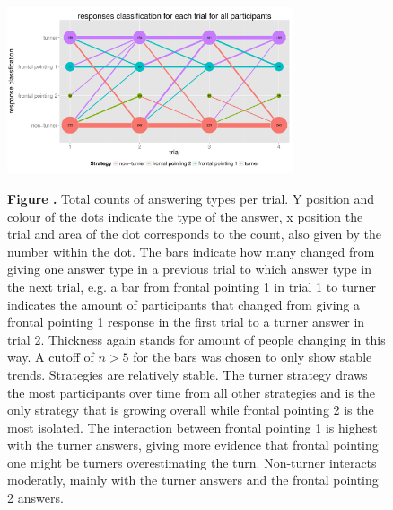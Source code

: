 \documentclass{frontiersSCNS} %
\begin{document}
\begin{figure}[h!]
\begin{center}
    \includegraphics[width=0.75\textwidth]{figures/stratGraphAll.pdf}
\end{center}
\textbf{\label{fig:03} Figure .}{  Total counts of answering types per trial. Y position and colour of the dots indicate the type of the answer, x position the trial and area of the dot corresponds to the count, also given by the number within the dot. The bars indicate how many changed from giving one answer type in a previous trial to which answer type in the next trial, e.g. a bar from frontal pointing 1 in trial 1 to turner indicates the amount of participants that changed from giving a frontal pointing 1 response in the first trial to a turner answer in trial 2. Thickness again stands for amount of people changing in this way. A cutoff of $n>5$ for the bars was chosen to only show stable trends.
Strategies are relatively stable. The turner strategy draws the most participants over time from all other strategies and is the only strategy that is growing overall while frontal pointing 2 is the most isolated. The interaction between frontal pointing 1 is highest with the turner answers, giving more evidence that frontal pointing one might be turners overestimating the turn. Non-turner interacts moderatly, mainly with the turner answers and the frontal pointing 2 answers.}
   \label{fig:stratGraphAll}
\end{figure}
\end{document}
